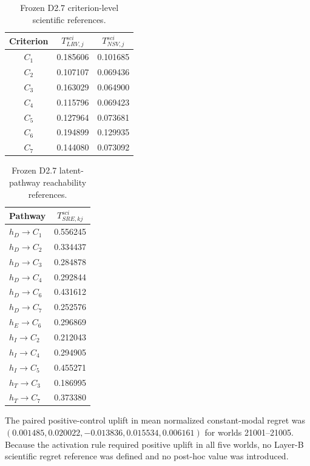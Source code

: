 \documentclass[runningheads]{llncs}
\begin{document}
\begin{table}[t]
\centering
\caption{Frozen D2.7 criterion-level scientific references.}
\label{supp:tab:d27layera}
\small
\begin{tabular}{@{}ccc@{}}
\toprule
Criterion & $T^{sci}_{LRV,j}$ & $T^{sci}_{NSV,j}$\\
\midrule
$C_1$ & 0.185606 & 0.101685\\
$C_2$ & 0.107107 & 0.069436\\
$C_3$ & 0.163029 & 0.064900\\
$C_4$ & 0.115796 & 0.069423\\
$C_5$ & 0.127964 & 0.073681\\
$C_6$ & 0.194899 & 0.129935\\
$C_7$ & 0.144080 & 0.073092\\
\bottomrule
\end{tabular}
\end{table}

\begin{table}[t]
\centering
\caption{Frozen D2.7 latent-pathway reachability references.}
\label{supp:tab:d27sre}
\small
\begin{tabular}{@{}lc@{}}
\toprule
Pathway & $T^{sci}_{SRE,kj}$\\
\midrule
$h_D\rightarrow C_1$ & 0.556245\\
$h_D\rightarrow C_2$ & 0.334437\\
$h_D\rightarrow C_3$ & 0.284878\\
$h_D\rightarrow C_4$ & 0.292844\\
$h_D\rightarrow C_6$ & 0.431612\\
$h_D\rightarrow C_7$ & 0.252576\\
$h_E\rightarrow C_6$ & 0.296869\\
$h_I\rightarrow C_2$ & 0.212043\\
$h_I\rightarrow C_4$ & 0.294905\\
$h_I\rightarrow C_5$ & 0.455271\\
$h_T\rightarrow C_3$ & 0.186995\\
$h_T\rightarrow C_7$ & 0.373380\\
\bottomrule
\end{tabular}
\end{table}

The paired positive-control uplift in mean normalized constant-modal regret was
$(0.001485,0.020022,-0.013836,0.015534,0.006161)$ for worlds 21001--21005. Because the activation
rule required positive uplift in all five worlds, no Layer-B scientific regret reference was
defined and no post-hoc value was introduced.
\end{document}
